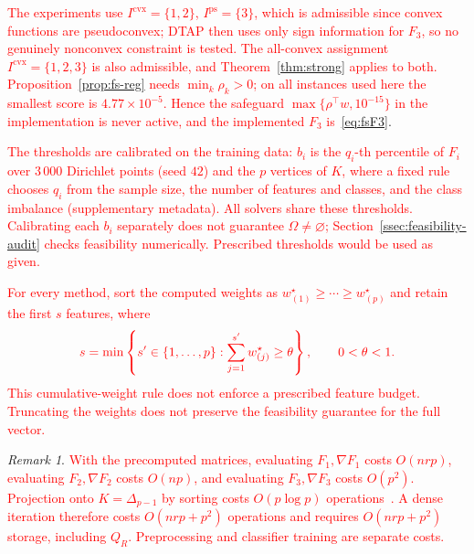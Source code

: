 \documentclass[]{interact}
\theoremstyle{plain}
\theoremstyle{definition}
\theoremstyle{remark}
\newtheorem{remark}{Remark}
\newcommand{\cvx}{\mathrm{cvx}}
\newcommand{\ps}{\mathrm{ps}}
\begin{document}
\leavevmode\textcolor{red}{The experiments use $I^{\cvx}=\{1,2\}$, $I^{\ps}=\{3\}$, which is admissible since convex functions are pseudoconvex; DTAP then uses only sign information for $F_3$, so no genuinely nonconvex constraint is tested. The all-convex assignment $I^{\cvx}=\{1,2,3\}$ is also admissible, and Theorem~\ref{thm:strong} applies to both. Proposition~\ref{prop:fs-reg} needs $\min_k\rho_k>0$; on all instances used here the smallest score is $4.77\times10^{-5}$. Hence the safeguard $\max\{\rho^\top w,10^{-15}\}$ in the implementation is never active, and the implemented $F_3$ is~\eqref{eq:fsF3}}.

\leavevmode\textcolor{red}{The thresholds are calibrated on the training data: $b_i$ is the $q_i$-th percentile of $F_i$ over $3\,000$ Dirichlet points (seed $42$) and the $p$ vertices of $K$, where a fixed rule chooses $q_i$ from the sample size, the number of features and classes, and the class imbalance (supplementary metadata). All solvers share these thresholds. Calibrating each $b_i$ separately does not guarantee $\Omega\ne\varnothing$; Section~\ref{ssec:feasibility-audit} checks feasibility numerically. Prescribed thresholds would be used as given.}

\leavevmode\textcolor{red}{For every method, sort the computed weights as $w^\star_{(1)}\ge\cdots\ge w^\star_{(p)}$ and retain the first $s$ features, where}
\begin{equation}\label{eq:thetaRule}\textcolor{red}{
s=\min\left\{s'\in\{1,\ldots,p\}:\sum_{j=1}^{s'}w^\star_{(j)}\ge\theta\right\},\qquad 0<\theta<1.
}\end{equation}
\leavevmode\textcolor{red}{This cumulative-weight rule does not enforce a prescribed feature budget. Truncating the weights does not preserve the feasibility guarantee for the full vector.}

\begin{remark}\label{rem:fs-cost}
\leavevmode\textcolor{red}{With the precomputed matrices, evaluating $F_1,\nabla F_1$ costs $O(nrp)$, evaluating $F_2,\nabla F_2$ costs $O(np)$, and evaluating $F_3,\nabla F_3$ costs $O(p^2)$. Projection onto $K=\Delta_{p-1}$ by sorting costs $O(p\log p)$ operations~\citep{condat2016simplex}. A dense iteration therefore costs $O(nrp+p^2)$ operations and requires $O(nrp+p^2)$ storage, including $Q_R$. Preprocessing and classifier training are separate costs.}
\end{remark}
\end{document}
